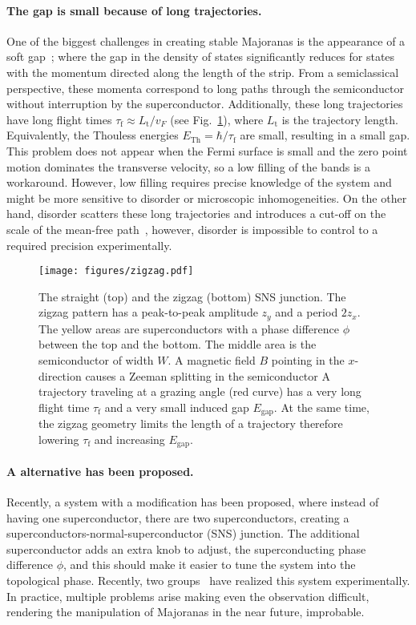 \documentclass[english, twocolumn, 10pt, aps, superscriptaddress, floatfix, prb, citeautoscript]{revtex4-1}
\renewcommand{\comment}[2]{#2}
\renewcommand{\comment}{\paragraph}
\begin{document}
\comment{The gap is small because of long trajectories.}
One of the biggest challenges in creating stable Majoranas is the appearance of a soft gap~\cite{ren_topological_2018}; where the gap in the density of states significantly reduces for states with the momentum directed along the length of the strip.
From a semiclassical perspective, these momenta correspond to long paths through the semiconductor without interruption by the superconductor.
Additionally, these long trajectories have long flight times $\tau_\textrm{f} \approx L_\textrm{t} / v_F$ (see Fig.~\ref{fig:setup}), where $L_\textrm{t}$ is the trajectory length.
Equivalently, the Thouless energies $E_{\textrm{Th}}=\hbar / \tau_\textrm{f}$ are small, resulting in a small gap.
This problem does not appear when the Fermi surface is small and the zero point motion dominates the transverse velocity, so a low filling of the bands is a workaround\cite{nijholt2015orbital}.
However, low filling requires precise knowledge of the system and might be more sensitive to disorder or microscopic inhomogeneities.
On the other hand, disorder scatters these long trajectories and introduces a cut-off on the scale of the mean-free path~\cite{haim_double-edge_2018}, however, disorder is impossible to control to a required precision experimentally.

\begin{figure}[!htb]
\centering
\texttt{[image: figures/zigzag.pdf]}
\caption{The straight (top) and the zigzag (bottom) SNS junction.
The zigzag pattern has a peak-to-peak amplitude $z_y$ and a period $2 z_x$.
The yellow areas are superconductors with a phase difference $\phi$ between the top and the bottom.
The middle area is the semiconductor of width $W$.
A magnetic field $B$ pointing in the $x$-direction causes a Zeeman splitting in the semiconductor
A trajectory traveling at a grazing angle (red curve) has a very long flight time $\tau_\textrm{f}$ and a very small induced gap $E_\textrm{gap}$.
At the same time, the zigzag geometry limits the length of a trajectory therefore lowering $\tau_\textrm{f}$ and increasing $E_\textrm{gap}$.
\label{fig:setup}}
\end{figure}

\comment{A alternative has been proposed.}
Recently, a system with a modification has been proposed\cite{pientka2017topological}, where instead of having one superconductor, there are two superconductors, creating a superconductors-normal-superconductor (SNS) junction.
The additional superconductor adds an extra knob to adjust, the superconducting phase difference $\phi$, and this should make it easier to tune the system into the topological phase.
Recently, two groups~\cite{fornieri_evidence_2018,ren_topological_2018} have realized this system experimentally.
In practice, multiple problems arise making even the observation difficult, rendering the manipulation of Majoranas in the near future, improbable.
\end{document}
